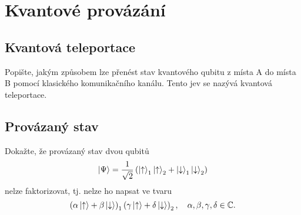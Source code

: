 \section{Kvantové provázání}
    \subsection{Kvantová teleportace}
        Popište, jakým způsobem lze přenést stav kvantového qubitu z místa A do místa B pomocí klasického komunikačního kanálu. Tento jev se nazývá kvantová teleportace.

    \subsection{Provázaný stav}
        Dokažte, že provázaný stav dvou qubitů 
        \begin{equation}
            \left|{\Psi}\right\rangle=\frac{1}{\sqrt{2}}\left(\left|{\uparrow}\right\rangle_{1}\left|{\uparrow}\right\rangle_{2}+\left|{\downarrow}\right\rangle_{1}\left|{\downarrow}\right\rangle_{2}\right)
        \end{equation}
        nelze faktorizovat, tj. nelze ho napsat ve tvaru
        \begin{equation}
            \left(\alpha\left|{\uparrow}\right\rangle+\beta\left|{\downarrow}\right\rangle\right)_{1}\left(\gamma\left|{\uparrow}\right\rangle+\delta\left|{\downarrow}\right\rangle\right)_{2},\quad\alpha,\beta,\gamma,\delta\in\mathbb{C}.
        \end{equation}